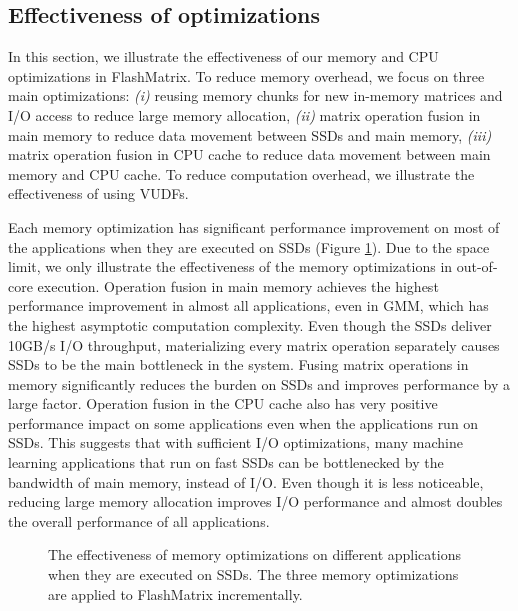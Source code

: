 \subsection{Effectiveness of optimizations}

In this section, we illustrate the effectiveness of our memory and CPU
optimizations in FlashMatrix. To reduce memory overhead, we focus on three
main optimizations: \textit{(i)} reusing memory chunks for new in-memory
matrices and I/O access to reduce large
memory allocation, \textit{(ii)} matrix operation fusion in main
memory to reduce data movement between SSDs and main memory, \textit{(iii)}
matrix operation fusion in CPU cache to reduce data movement between main
memory and CPU cache. To reduce computation overhead, we illustrate
the effectiveness of using VUDFs.

Each memory optimization has significant performance improvement on most of
the applications when they are executed on SSDs (Figure \ref{perf:opts}).
Due to the space limit, we only illustrate the effectiveness of the memory
optimizations in out-of-core execution. Operation fusion in main memory achieves
the highest performance improvement in almost all applications, even in GMM,
which has the highest asymptotic computation complexity. Even though the SSDs
deliver 10GB/s I/O throughput, materializing every matrix operation separately
causes SSDs to be the main bottleneck in the system.
Fusing matrix operations in memory significantly reduces the burden on SSDs and
improves performance by a large factor. Operation fusion in the CPU cache also
has very positive performance impact on some applications even when
the applications run on SSDs. This suggests that with sufficient I/O optimizations,
many machine learning applications that run on fast SSDs can be bottlenecked by
the bandwidth of main memory, instead of I/O. Even though it is less noticeable,
reducing large memory allocation improves I/O performance and almost doubles
the overall performance of all applications.

\begin{figure}
	\begin{center}
		\footnotesize
		\vspace{-15pt}
		
		\vspace{-10pt}
		\caption{The effectiveness of memory optimizations on different
			applications when they are executed on SSDs. The three memory
		optimizations are applied to FlashMatrix incrementally.}
		\label{perf:opts}
	\end{center}
\end{figure}

